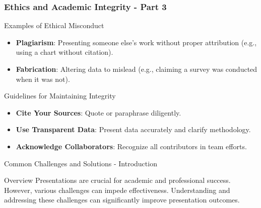 \documentclass[aspectratio=169]{beamer}
\begin{document}
\begin{frame}[fragile]
    \frametitle{Ethics and Academic Integrity - Part 3}
    \begin{block}{Examples of Ethical Misconduct}
        \begin{itemize}
            \item \textbf{Plagiarism}: Presenting someone else's work without proper attribution (e.g., using a chart without citation).
            \item \textbf{Fabrication}: Altering data to mislead (e.g., claiming a survey was conducted when it was not).
        \end{itemize}
    \end{block}

    \begin{block}{Guidelines for Maintaining Integrity}
        \begin{itemize}
            \item \textbf{Cite Your Sources}: Quote or paraphrase diligently.
            \item \textbf{Use Transparent Data}: Present data accurately and clarify methodology.
            \item \textbf{Acknowledge Collaborators}: Recognize all contributors in team efforts.
        \end{itemize}
    \end{block}
\end{frame}

\begin{frame}[fragile]{Common Challenges and Solutions - Introduction}
    \begin{block}{Overview}
        Presentations are crucial for academic and professional success. However, various challenges can impede effectiveness. 
        Understanding and addressing these challenges can significantly improve presentation outcomes.
    \end{block}
\end{frame}
\end{document}
